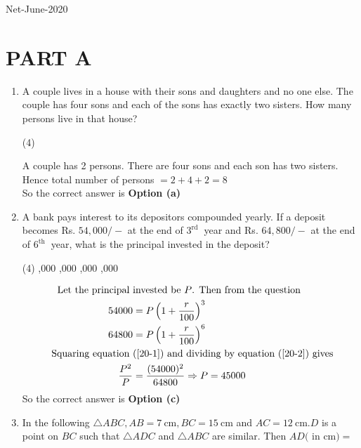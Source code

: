 \begin{abox}
	Net-June-2020
	\end{abox}
\section{PART A}
\begin{enumerate}
	\item A couple lives in a house with their sons and daughters and no one else. The couple has four sons and each of the sons has exactly two sisters. How many persons live in that house?
	 \begin{tasks}(4)
	\end{tasks}
\begin{answer}
 A couple has 2 persons. There are four sons and each son has two sisters. Hence total number of persons $=2+4+2=8$\\
So the correct answer is \textbf{Option (a)}
\end{answer}
\item A bank pays interest to its depositors compounded yearly. If a deposit becomes Rs. $54,000 /-$ at the end of $3^{\text {rd }}$ year and Rs. $64,800 /-$ at the end of $6^{\text {th }}$ year, what is the principal invested in the deposit?
 \begin{tasks}(4)
	,000
	,000
	,000
	,000
\end{tasks}
\begin{answer}
	\begin{align}
\text{	Let the principal }&\text{invested be $P$. Then from the question}\notag\\
	54000&=P\left(1+\frac{r}{100}\right)^{3} \label{20-1}\\
	64800&=P\left(1+\frac{r}{100}\right)^{6}\label{20-2}\\
\text{	Squaring equation }&\text{(\ref{20-1}) and dividing by equation (\ref{20-2}) gives}\notag\\
	\frac{P^{2}}{P}&=\frac{(54000)^{2}}{64800} \Rightarrow P=45000 \notag
	\end{align}
	So the correct answer is \textbf{Option (c)}
\end{answer}
\item In the following $\triangle A B C, A B=7 \mathrm{~cm}, B C=15 \mathrm{~cm}$ and $A C=12 \mathrm{~cm} . D$ is a point on $B C$ such that $\triangle A D C$ and $\triangle A B C$ are similar. Then $A D($ in $\mathrm{cm})=$		

\end{enumerate}
